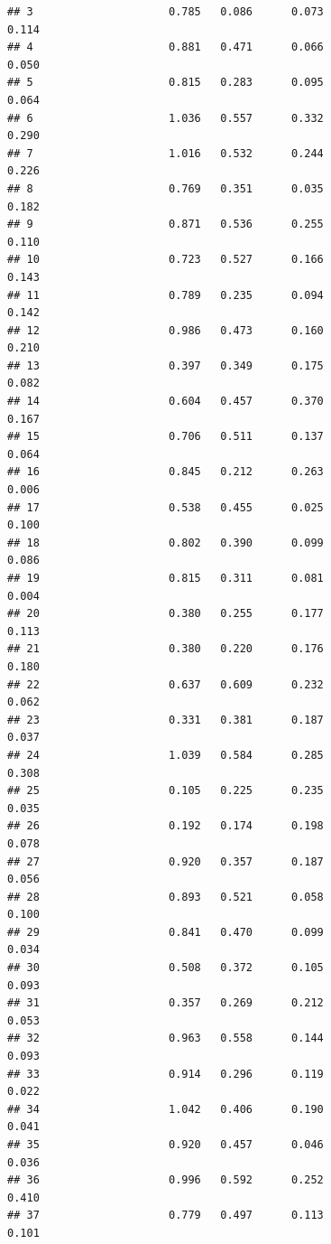 \documentclass[]{article}
\begin{document}
\begin{verbatim}
## 3                     0.785   0.086      0.073                     0.114
## 4                     0.881   0.471      0.066                     0.050
## 5                     0.815   0.283      0.095                     0.064
## 6                     1.036   0.557      0.332                     0.290
## 7                     1.016   0.532      0.244                     0.226
## 8                     0.769   0.351      0.035                     0.182
## 9                     0.871   0.536      0.255                     0.110
## 10                    0.723   0.527      0.166                     0.143
## 11                    0.789   0.235      0.094                     0.142
## 12                    0.986   0.473      0.160                     0.210
## 13                    0.397   0.349      0.175                     0.082
## 14                    0.604   0.457      0.370                     0.167
## 15                    0.706   0.511      0.137                     0.064
## 16                    0.845   0.212      0.263                     0.006
## 17                    0.538   0.455      0.025                     0.100
## 18                    0.802   0.390      0.099                     0.086
## 19                    0.815   0.311      0.081                     0.004
## 20                    0.380   0.255      0.177                     0.113
## 21                    0.380   0.220      0.176                     0.180
## 22                    0.637   0.609      0.232                     0.062
## 23                    0.331   0.381      0.187                     0.037
## 24                    1.039   0.584      0.285                     0.308
## 25                    0.105   0.225      0.235                     0.035
## 26                    0.192   0.174      0.198                     0.078
## 27                    0.920   0.357      0.187                     0.056
## 28                    0.893   0.521      0.058                     0.100
## 29                    0.841   0.470      0.099                     0.034
## 30                    0.508   0.372      0.105                     0.093
## 31                    0.357   0.269      0.212                     0.053
## 32                    0.963   0.558      0.144                     0.093
## 33                    0.914   0.296      0.119                     0.022
## 34                    1.042   0.406      0.190                     0.041
## 35                    0.920   0.457      0.046                     0.036
## 36                    0.996   0.592      0.252                     0.410
## 37                    0.779   0.497      0.113                     0.101

\end{verbatim}
\end{document}

